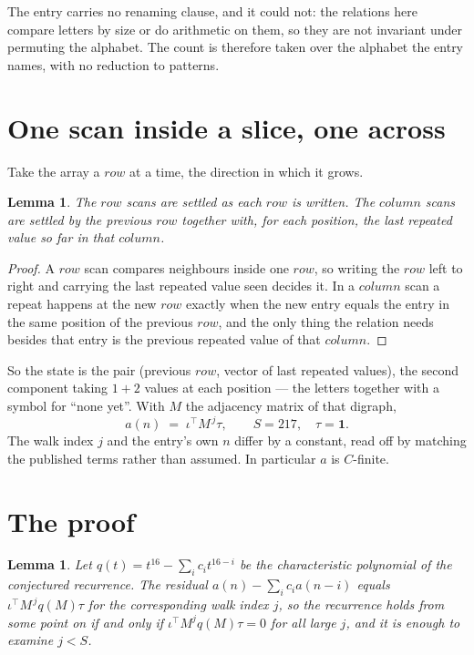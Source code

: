 \documentclass[11pt,a4paper]{article}
\theoremstyle{plain}
\newtheorem{lemma}[theorem]{Lemma}
\theoremstyle{definition}
\begin{document}
The entry carries no renaming clause, and it could not: the relations here compare letters by
size or do arithmetic on them, so they are not invariant under permuting the alphabet. The
count is therefore taken over the alphabet the entry names, with no reduction to patterns.

\section{One scan inside a slice, one across}

Take the array a $row$ at a time, the direction in which it grows.

\begin{lemma}\label{lem:state}
The $row$ scans are settled as each $row$ is written. The $column$ scans are
settled by the previous $row$ together with, for each position, the last repeated value
so far in that $column$.
\end{lemma}

\begin{proof}
A $row$ scan compares neighbours inside one $row$, so writing the
$row$ left to right and carrying the last repeated value seen decides it. In a
$column$ scan a repeat happens at the new $row$ exactly when the new entry equals the
entry in the same position of the previous $row$, and the only thing the relation needs
besides that entry is the previous repeated value of that $column$.
\end{proof}

So the state is the pair (previous $row$, vector of last repeated values), the second
component taking $1+2$ values at each position --- the letters together with a symbol for
``none yet''. With $M$ the adjacency matrix of that digraph,
\[
a(n)\;=\;\iota^{\!\top}M^{\,j}\tau ,\qquad S=217,\quad\tau=\mathbf{1} .
\]
The walk index $j$ and the entry's own $n$ differ by a constant, read off by matching the
published terms rather than assumed. In particular $a$ is $C$-finite.

\section{The proof}

\begin{lemma}\label{lem:crit}
Let $q(t)=t^{16}-\sum_i c_it^{16-i}$ be the characteristic polynomial of the
conjectured recurrence. The residual $a(n)-\sum_ic_ia(n-i)$ equals
$\iota^{\!\top}M^{\,j}q(M)\tau$ for the corresponding walk index $j$, so the recurrence
holds from some point on if and only if $\iota^{\!\top}M^{j}q(M)\tau=0$ for all large $j$,
and it is enough to examine $j<S$.
\end{lemma}
\end{document}
